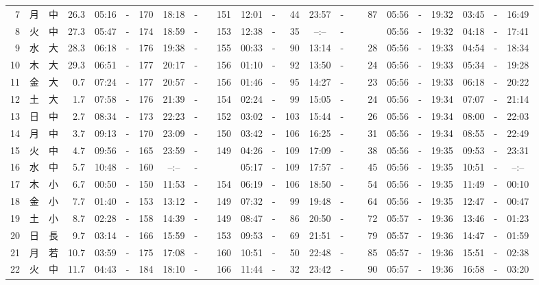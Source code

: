 \documentclass[12pt,a4j]{jsarticle}
\begin{document}
\begin{table}[htbp]
\begin{center}
{\begin{tabular}{|rc|cr|ccrccr|ccrccr|ccc|ccc|}
 7 & 月 & 中 & 26.3 &  05:16 &-& 170 &  18:18 &-& 151 &  12:01 &-&  44 &  23:57 &-&  87 & 05:56 & -& 19:32 & 03:45 & -& 16:49 \\
 8 & 火 & 中 & 27.3 &  05:47 &-& 174 &  18:59 &-& 153 &  12:38 &-&  35 &  --:-- &-&~~~~~ & 05:56 & -& 19:32 & 04:18 & -& 17:41 \\
 9 & 水 & 大 & 28.3 &  06:18 &-& 176 &  19:38 &-& 155 &  00:33 &-&  90 &  13:14 &-&  28 & 05:56 & -& 19:33 & 04:54 & -& 18:34 \\
10 & 木 & 大 & 29.3 &  06:51 &-& 177 &  20:17 &-& 156 &  01:10 &-&  92 &  13:50 &-&  24 & 05:56 & -& 19:33 & 05:34 & -& 19:28 \\
11 & 金 & 大 &  0.7 &  07:24 &-& 177 &  20:57 &-& 156 &  01:46 &-&  95 &  14:27 &-&  23 & 05:56 & -& 19:33 & 06:18 & -& 20:22 \\
12 & 土 & 大 &  1.7 &  07:58 &-& 176 &  21:39 &-& 154 &  02:24 &-&  99 &  15:05 &-&  24 & 05:56 & -& 19:34 & 07:07 & -& 21:14 \\
13 & 日 & 中 &  2.7 &  08:34 &-& 173 &  22:23 &-& 152 &  03:02 &-& 103 &  15:44 &-&  26 & 05:56 & -& 19:34 & 08:00 & -& 22:03 \\
14 & 月 & 中 &  3.7 &  09:13 &-& 170 &  23:09 &-& 150 &  03:42 &-& 106 &  16:25 &-&  31 & 05:56 & -& 19:34 & 08:55 & -& 22:49 \\
15 & 火 & 中 &  4.7 &  09:56 &-& 165 &  23:59 &-& 149 &  04:26 &-& 109 &  17:09 &-&  38 & 05:56 & -& 19:35 & 09:53 & -& 23:31 \\
16 & 水 & 中 &  5.7 &  10:48 &-& 160 &  --:-- &-&~~~~~ &  05:17 &-& 109 &  17:57 &-&  45 & 05:56 & -& 19:35 & 10:51 & -& --:-- \\
17 & 木 & 小 &  6.7 &  00:50 &-& 150 &  11:53 &-& 154 &  06:19 &-& 106 &  18:50 &-&  54 & 05:56 & -& 19:35 & 11:49 & -& 00:10 \\
18 & 金 & 小 &  7.7 &  01:40 &-& 153 &  13:12 &-& 149 &  07:32 &-&  99 &  19:48 &-&  64 & 05:56 & -& 19:35 & 12:47 & -& 00:47 \\
19 & 土 & 小 &  8.7 &  02:28 &-& 158 &  14:39 &-& 149 &  08:47 &-&  86 &  20:50 &-&  72 & 05:57 & -& 19:36 & 13:46 & -& 01:23 \\
20 & 日 & 長 &  9.7 &  03:14 &-& 166 &  15:59 &-& 153 &  09:53 &-&  69 &  21:51 &-&  79 & 05:57 & -& 19:36 & 14:47 & -& 01:59 \\
21 & 月 & 若 & 10.7 &  03:59 &-& 175 &  17:08 &-& 160 &  10:51 &-&  50 &  22:48 &-&  85 & 05:57 & -& 19:36 & 15:51 & -& 02:38 \\
22 & 火 & 中 & 11.7 &  04:43 &-& 184 &  18:10 &-& 166 &  11:44 &-&  32 &  23:42 &-&  90 & 05:57 & -& 19:36 & 16:58 & -& 03:20 \\

\end{tabular}}
\end{center}
\end{table}
\end{document}
